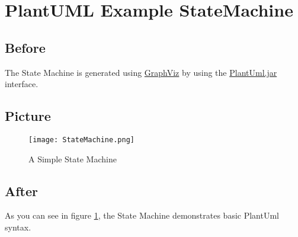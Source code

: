 \documentclass{article}%
\begin{document}
%
\section{PlantUML Example StateMachine}%

  \subsection{Before}%
  The State Machine is generated using
  \href{https://graphviz.org}{GraphViz} by using the
  \href{https://plantuml.com}{PlantUml.jar} interface.

  \subsection{Picture}%

  \begin{figure}[h]%
    \centering%
    \texttt{[image: StateMachine.png]}%
    \caption{A Simple State Machine}%
    \label{fig:statemachine}%
  \end{figure}%

  \subsection{After}%
  As you can see in figure \ref{fig:statemachine}, the State Machine
  demonstrates basic PlantUml syntax.
\end{document}
